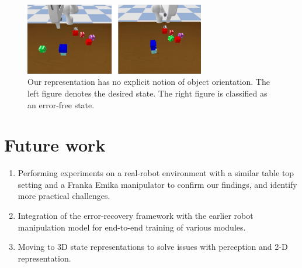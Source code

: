 \begin{figure}
    \centering
    \includegraphics[width=0.7\textwidth]{assets/orient.png}
    \caption{Our representation has no explicit notion of object orientation. The left figure denotes the desired state. The right figure is classified as an error-free state.}
    \label{fig:orient}
\end{figure}

\section{Future work}

\begin{enumerate}
    \item Performing experiments on a real-robot environment with a similar table top setting and a Franka Emika manipulator to confirm our findings, and identify more practical challenges.
    \item Integration of the error-recovery framework with the earlier robot manipulation model for end-to-end training of various modules.
    \item Moving to 3D state representations to solve issues with perception and 2-D representation.
\end{enumerate}

